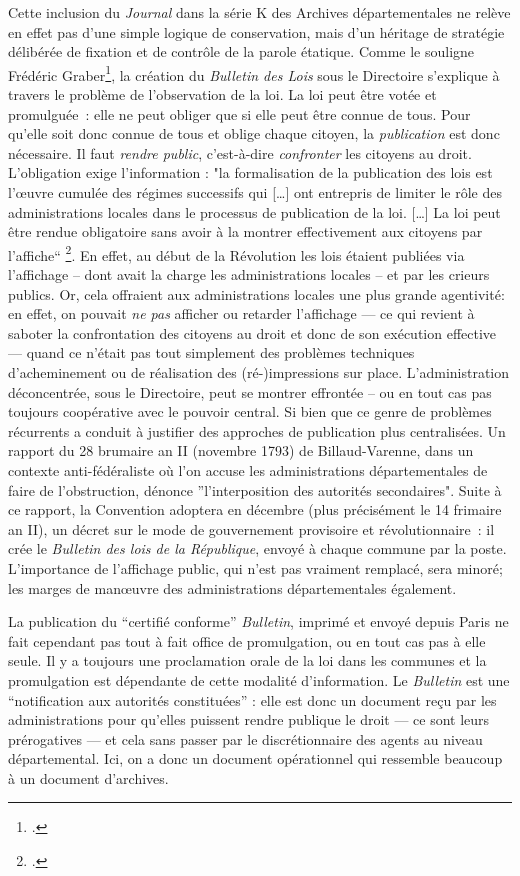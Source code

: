 Cette inclusion du \emph{Journal} dans la série K des Archives départementales ne relève en effet pas d’une simple logique de conservation, mais d’un héritage de stratégie délibérée de fixation et de contrôle de la parole étatique. Comme le souligne Frédéric Graber\footcite[][]{graber}, la création du \emph{Bulletin des Lois} sous le Directoire s'explique à travers le problème de l'observation de la loi. La loi peut être votée et promulguée : elle ne peut obliger que si elle peut être connue de tous. Pour qu’elle soit donc connue de tous et oblige chaque citoyen, la \emph{publication} est donc nécessaire. Il faut \emph{rendre public}, c’est-à-dire \emph{confronter} les citoyens au droit. L’obligation exige l’information : "la formalisation de la publication des lois est l’œuvre cumulée des régimes successifs qui […] ont entrepris de limiter le rôle des 
administrations locales dans le processus de publication de la loi. […] La loi peut être rendue obligatoire sans avoir à la montrer effectivement aux citoyens par l’affiche\enquote{ \footcite[][]{graber}. En effet, au début de la Révolution les lois étaient publiées via l’affichage -- dont avait la charge les administrations locales -- et par les crieurs publics. Or, cela  offraient aux administrations locales une plus grande agentivité: en  effet, on pouvait \emph{ne pas} afficher ou retarder l’affichage — ce  qui revient à saboter la confrontation des citoyens au droit et donc de son exécution effective — quand ce n’était pas tout simplement des problèmes techniques d’acheminement ou de réalisation des (ré-)impressions sur place. L’administration déconcentrée, sous le Directoire, peut se montrer effrontée -- ou en tout cas pas toujours coopérative avec le pouvoir central. Si bien que ce genre de problèmes récurrents a conduit à justifier des approches de publication plus centralisées. Un rapport du 28 brumaire an II (novembre 1793) de Billaud-Varenne, dans un contexte anti-fédéraliste où l’on accuse les administrations  départementales de faire de l’obstruction, dénonce }l’interposition des  autorités secondaires". Suite à ce rapport, la Convention adoptera en décembre (plus précisément le 14 frimaire an II), un décret sur le mode de gouvernement provisoire et révolutionnaire : il crée le \emph{Bulletin des lois de la République}, envoyé à chaque commune par la poste. L’importance de l’affichage public, qui n’est pas vraiment remplacé, sera minoré; les marges de manœuvre des administrations départementales également.

La publication du \enquote{certifié conforme} \emph{Bulletin}, imprimé et envoyé depuis Paris ne fait cependant pas tout à fait office de promulgation, ou en tout cas pas à elle seule. Il y a toujours une proclamation orale de la loi dans les communes et la promulgation est dépendante de cette modalité d’information. Le \emph{Bulletin} est une \enquote{notification aux autorités constituées} : elle est donc un document reçu par les administrations pour qu’elles puissent rendre publique le droit — ce sont leurs  prérogatives — et cela sans passer par le discrétionnaire des agents au  niveau départemental. Ici, on a donc un document opérationnel qui ressemble beaucoup à un document d’archives.

